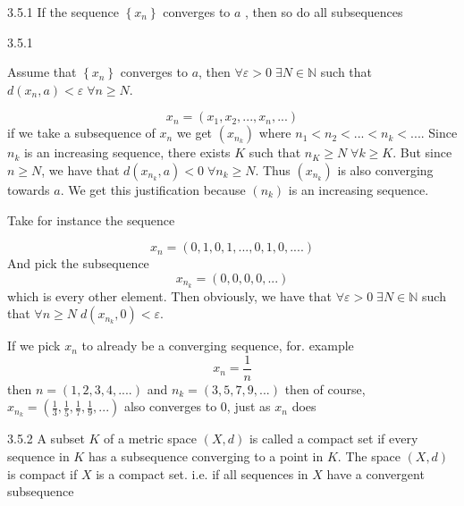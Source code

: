 \documentclass[a4paper,norsk]{article}
\renewcommand{\geq}{\geqslant}
\renewcommand{\epsilon}{\varepsilon}
\begin{document}
\begin{propositionbox}{3.5.1}{}
If the sequence $ \left\{ x_n \right\}  $ converges to $ a $ , then so do all subsequences

\begin{proofbox}{3.5.1}{}

  Assume that $ \left\{ x_n \right\}  $ converges to $ a $, then $ \forall \epsilon > 0 \; \exists N \in \mathbb{N} $ such that $ d \left( x_n, a \right) < \epsilon  \; \forall n \geq N $. 
  
  \[
      x_n = \left( x_1, x_2, ..., x_n, ... \right) 
  \]
  if we take a subsequence of $ x_n $ we get $ \left( x_{n_k} \right)  $ where $ n_1 < n_2 < ... < n_k < ... $. Since $ n_k $ is an increasing sequence, there exists $ K $ such that $ n_K \geq N \; \forall k \geq K$. But since $ n \geq N $, we have that $ d \left( x_{n_k}, a \right) < 0 \; \forall n_k \geq N $. Thus $ \left( x_{n_k} \right)  $  is also converging towards $ a $. We get this justification because $ \left( n_k \right)  $ is an increasing sequence.

  Take for instance the sequence

  \[
      x_n = \left( 0, 1, 0, 1, ...,0, 1, 0, .... \right) 
  \]
  And pick the subsequence
  \[
      x_{n_k} = \left( 0, 0, 0, 0, ... \right) 
  \]
  which is every other element. Then obviously, we have that $ \forall \epsilon > 0 \; \exists N \in \mathbb{N} $ such that $ \forall n \geq N \; d \left( x_{n_k}, 0 \right) < \epsilon   $.


  If we pick $ x_n $ to already be a converging sequence, for. example
  \[
      x_n = \frac{ 1 }{ n }
  \]
  then $ n = \left( 1,2, 3, 4,.... \right)  $ and $ n_k = \left( 3, 5,  7,9,... \right)  $ then of course, $ x_{n_k} = \left( \frac{ 1 }{ 3 }, \frac{ 1 }{ 5 }, \frac{ 1 }{ 7 }, \frac{ 1 }{ 9 },... \right)  $ also converges to $ 0 $, just as $ x_n $ does
  
  
  
  
  
\end{proofbox}
\end{propositionbox}

\begin{definitionbox}{3.5.2}{}
A subset $ K $ of a metric space $ \left( X, d \right)  $ is called a compact set if every sequence in $ K $ has a subsequence converging to a point in $ K $. The space $ \left( X, d \right)  $ is compact if $ X $ is a compact set. i.e. if all sequences in $ X $ have a convergent subsequence
\end{definitionbox}
\end{document}
